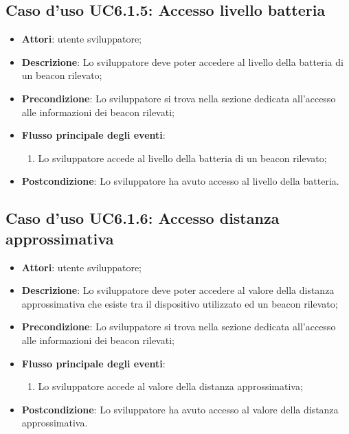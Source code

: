 \documentclass[../AnalisiDeiRequisiti.tex]{subfiles}
\begin{document}
\subsection{Caso d'uso UC6.1.5: Accesso livello batteria}
\begin{itemize}
	\item \textbf{Attori}: utente sviluppatore;
	\item \textbf{Descrizione}: Lo sviluppatore deve poter accedere al livello della batteria di un beacon rilevato; 
	\item \textbf{Precondizione}: Lo sviluppatore si trova nella sezione dedicata all'accesso alle informazioni dei beacon rilevati;
	
	\item \textbf{Flusso principale degli eventi}:
	\begin{enumerate}
		\item Lo sviluppatore accede al livello della batteria di un beacon rilevato;
		
	\end{enumerate}
	\item \textbf{Postcondizione}: Lo sviluppatore ha avuto accesso al livello della batteria.
\end{itemize}
\hypertarget{UC6.1.6}{}
\subsection{Caso d'uso UC6.1.6: Accesso distanza approssimativa}
\begin{itemize}
	\item \textbf{Attori}: utente sviluppatore;
	\item \textbf{Descrizione}: Lo sviluppatore deve poter accedere al valore della distanza approssimativa che esiste tra il dispositivo utilizzato ed un beacon rilevato; 
	\item \textbf{Precondizione}: Lo sviluppatore si trova nella sezione dedicata all'accesso alle informazioni dei beacon rilevati;
	
	\item \textbf{Flusso principale degli eventi}:
	\begin{enumerate}
		\item Lo sviluppatore accede al valore della distanza approssimativa;
		
	\end{enumerate}
	\item \textbf{Postcondizione}: Lo sviluppatore ha avuto accesso al valore della distanza approssimativa.
\end{itemize}
\hypertarget{UC6.1.7}{}
\end{document}

